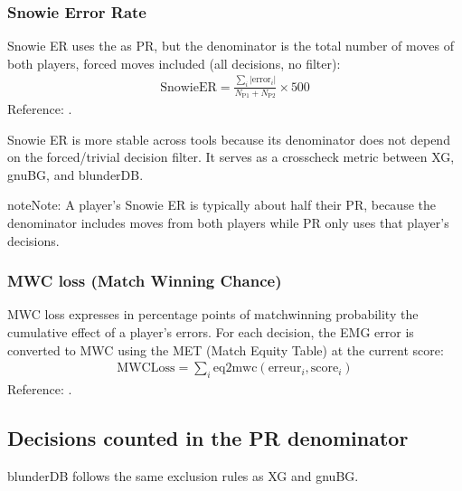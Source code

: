 \documentclass[letterpaper,10pt,english]{sphinxmanual}
\begin{document}
\subsubsection{Snowie Error Rate}
\label{\detokenize{stats_parity:snowie-error-rate}}
\sphinxAtStartPar
Snowie ER uses the  as PR, but the denominator is the total number of moves of both players, forced moves included (all decisions, no filter):
\begin{equation*}
\begin{split}\mathrm{SnowieER} = \frac{\sum_i |\mathrm{error}_i|}{N_\text{P1} + N_\text{P2}} \times 500\end{split}
\end{equation*}
\sphinxAtStartPar
Reference: .

\sphinxAtStartPar
Snowie ER is more stable across tools because its denominator does not depend on the forced/trivial decision filter. It serves as a cross\sphinxhyphen{}check metric between XG, gnuBG, and blunderDB.

\begin{sphinxadmonition}{note}{Note:}
\sphinxAtStartPar
A player’s Snowie ER is typically about half their PR, because the denominator includes moves from both players while PR only uses that player’s decisions.
\end{sphinxadmonition}


\subsubsection{MWC loss (Match Winning Chance)}
\label{\detokenize{stats_parity:perte-mwc-match-winning-chance}}
\sphinxAtStartPar
MWC loss expresses in percentage points of match\sphinxhyphen{}winning probability the cumulative effect of a player’s errors. For each decision, the EMG error is converted to MWC using the MET (Match Equity Table) at the current score:
\begin{equation*}
\begin{split}\mathrm{MWCLoss} = \sum_i \mathrm{eq2mwc}(\mathrm{erreur}_i, \mathrm{score}_i)\end{split}
\end{equation*}
\sphinxAtStartPar
Reference: .


\subsection{Decisions counted in the PR denominator}
\label{\detokenize{stats_parity:decisions-comptees-au-denominateur-du-pr}}
\sphinxAtStartPar
blunderDB follows the same exclusion rules as XG and gnuBG.
\end{document}
